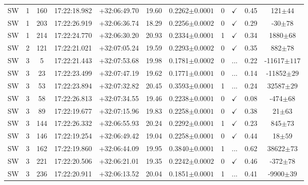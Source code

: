 \begin{table*}
\begin{tabular}{ccccccccccc}
SW & 1 & 160 & 17:22:18.982 & +32:06:49.70 & 19.60 & 0.2262$\pm{0.0001}$ & 0 & $\checkmark$ & 0.45 & 121$\pm{44}$ \\
SW & 1 & 203 & 17:22:26.919 & +32:06:36.74 & 18.29 & 0.2256$\pm{0.0002}$ & 0 & $\checkmark$ & 0.29 & -30$\pm{78}$ \\
SW & 1 & 214 & 17:22:24.770 & +32:06:30.20 & 20.93 & 0.2334$\pm{0.0001}$ & 1 & $\checkmark$ & 0.34 & 1880$\pm{68}$ \\
SW & 2 & 121 & 17:22:21.021 & +32:07:05.24 & 19.59 & 0.2293$\pm{0.0002}$ & 0 & $\checkmark$ & 0.35 & 882$\pm{78}$ \\
SW & 3 & 5 & 17:22:21.443 & +32:07:53.68 & 19.98 & 0.1781$\pm{0.0002}$ & 0 & ... & 0.22 & -11617$\pm{117}$ \\
SW & 3 & 23 & 17:22:23.499 & +32:07:47.19 & 19.62 & 0.1771$\pm{0.0001}$ & 0 & ... & 0.14 & -11852$\pm{29}$ \\
SW & 3 & 53 & 17:22:23.894 & +32:07:32.82 & 20.45 & 0.3593$\pm{0.0001}$ & 1 & ... & 0.24 & 32587$\pm{29}$ \\
SW & 3 & 58 & 17:22:26.813 & +32:07:34.55 & 19.46 & 0.2238$\pm{0.0001}$ & 0 & $\checkmark$ & 0.08 & -474$\pm{68}$ \\
SW & 3 & 89 & 17:22:19.677 & +32:07:15.96 & 19.83 & 0.2258$\pm{0.0001}$ & 0 & $\checkmark$ & 0.38 & 21$\pm{63}$ \\
SW & 3 & 144 & 17:22:26.332 & +32:06:55.93 & 20.24 & 0.2292$\pm{0.0001}$ & 1 & $\checkmark$ & 0.23 & 845$\pm{73}$ \\
SW & 3 & 146 & 17:22:19.254 & +32:06:49.42 & 19.04 & 0.2258$\pm{0.0001}$ & 0 & $\checkmark$ & 0.44 & 18$\pm{59}$ \\
SW & 3 & 162 & 17:22:19.860 & +32:06:44.09 & 19.95 & 0.3840$\pm{0.0001}$ & 1 & ... & 0.62 & 38622$\pm{73}$ \\
SW & 3 & 221 & 17:22:20.506 & +32:06:21.01 & 19.35 & 0.2242$\pm{0.0002}$ & 0 & $\checkmark$ & 0.46 & -372$\pm{78}$ \\
SW & 3 & 236 & 17:22:20.911 & +32:06:13.52 & 20.04 & 0.1851$\pm{0.0001}$ & 1 & ... & 0.41 & -9900$\pm{39}$ \\
		\hline
	\end{tabular}
	\label{tbl:c260p61+32p13}
\end{table*}

